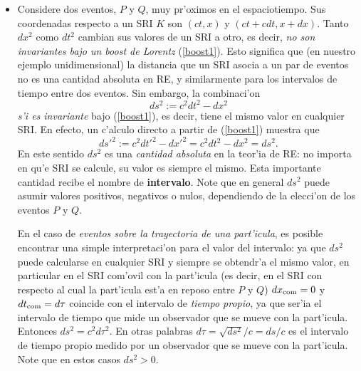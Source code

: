 \begin{itemize}
\item Considere dos eventos, $P$ y $Q$, muy pr'oximos en el espaciotiempo. Sus coordenadas respecto a un SRI $K$ son $(ct,x)$ y $(ct+cdt,x+dx)$. Tanto $dx^2$ como $dt^2$ cambian sus valores de un SRI a otro, es decir,  \textit{no son invariantes bajo un boost de Lorentz} (\ref{boost1}). Esto significa que (en nuestro ejemplo unidimensional) la distancia que un SRI asocia a un par de eventos no es una cantidad absoluta en RE, y similarmente para los intervalos de tiempo entre dos eventos. Sin embargo, la combinaci'on
\begin{equation}
ds^2:=c^2dt^2-dx^2
\end{equation}
\textit{s'i es invariante} bajo (\ref{boost1}), es decir, tiene el mismo valor en cualquier SRI. En efecto, un c'alculo directo a partir de (\ref{boost1}) muestra que
\begin{equation}
ds'^2:=c^2dt'^2-dx'^2=c^2dt^2-dx^2=ds^2.
\end{equation}
En este sentido $ds^2$ es una \textit{cantidad absoluta} en la teor'ia de RE: no importa en qu'e SRI se calcule, su valor es siempre el mismo. Esta importante cantidad recibe el nombre de \textbf{intervalo}. Note que en general $ds^2$ puede asumir valores positivos, negativos o nulos, dependiendo de la elecci'on de los eventos $P$ y $Q$.

En el caso de \textit{eventos sobre la trayectoria de una part'icula}, es posible encontrar una simple interpretaci'on para el valor del intervalo: ya que $ds^2$ puede calcularse en cualquier SRI y siempre se obtendr'a el mismo valor, en particular en el SRI com'ovil con la part'icula (es decir, en el SRI con respecto al cual la part'icula est'a en reposo entre $P$ y $Q$) $dx_{\rm com}=0$ y $dt_{\rm com}=d\tau$ coincide con el intervalo de \textit{tiempo propio}, ya que ser'ia el intervalo de tiempo que mide un observador que se mueve con la part'icula. Entonces $ds^2=c^2d\tau^2$. En otras palabras $d\tau=\sqrt{ds^2}/c=ds/c$ es el intervalo de tiempo propio medido por un observador que se mueve con la part'icula. Note que en estos casos $ds^2>0$.

\end{itemize}




